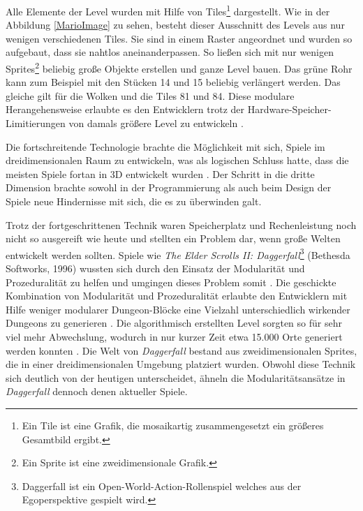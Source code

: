 \par
Alle Elemente der Level wurden mit Hilfe von Tiles\footnote{Ein Tile ist eine Grafik, die mosaikartig zusammengesetzt ein größeres Gesamtbild ergibt.} dargestellt. Wie in der Abbildung \ref{MarioImage} zu sehen, besteht dieser Ausschnitt des Levels aus nur wenigen verschiedenen Tiles. Sie sind in einem Raster angeordnet und wurden so aufgebaut, dass sie nahtlos aneinanderpassen. So ließen sich mit nur wenigen Sprites\footnote{Ein Sprite ist eine zweidimensionale Grafik.} beliebig große Objekte erstellen und ganze Level bauen. Das grüne Rohr kann zum Beispiel mit den Stücken 14 und 15 beliebig verlängert werden. Das gleiche gilt für die Wolken und die Tiles 81 und 84. Diese modulare Herangehensweise erlaubte es den Entwicklern trotz der Hardware-Speicher-Limitierungen von damals größere Level zu entwickeln \parencite{Mario}.
\par
Die fortschreitende Technologie brachte die Möglichkeit mit sich, Spiele im dreidimensionalen Raum zu entwickeln, was als logischen Schluss hatte, dass die meisten Spiele fortan in 3D entwickelt wurden \parencite{GameHistory}. Der Schritt in die dritte Dimension brachte sowohl in der Programmierung als auch beim Design der Spiele neue Hindernisse mit sich, die es zu überwinden galt.
\par
Trotz der fortgeschrittenen Technik waren Speicherplatz und Rechenleistung noch nicht so ausgereift wie heute und stellten ein Problem dar, wenn große Welten entwickelt werden sollten. Spiele wie \textit{The Elder Scrolls II: Daggerfall}\footnote{Daggerfall ist ein Open-World-Action-Rollenspiel welches aus der Egoperspektive gespielt wird.} (Bethesda Softworks, 1996) wussten sich durch den Einsatz der Modularität und Prozeduralität zu helfen und umgingen dieses Problem somit \parencite{Fallout4}. Die geschickte Kombination von Modularität und Prozeduralität erlaubte den Entwicklern mit Hilfe weniger modularer Dungeon-Blöcke eine Vielzahl unterschiedlich wirkender Dungeons zu generieren \parencite{Fallout4}. Die algorithmisch erstellten Level sorgten so für sehr viel mehr Abwechslung, wodurch in nur kurzer Zeit etwa 15.000 Orte generiert werden konnten \parencite{Daggerfall}. Die Welt von \textit{Daggerfall} bestand aus zweidimensionalen Sprites, die in einer dreidimensionalen Umgebung platziert wurden. Obwohl diese Technik sich deutlich von der heutigen unterscheidet, ähneln die Modularitätsansätze in \textit{Daggerfall} dennoch denen aktueller Spiele.
